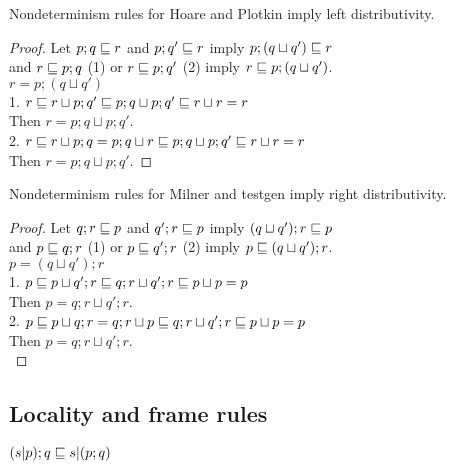 \documentclass{article}
\begin{document}
\begin{theorem}
Nondeterminism rules for Hoare and Plotkin imply left distributivity.
\end{theorem}

\verified

\begin{proof}
Let $p; q \sqsubseteq r$ and $p; q' \sqsubseteq r$ imply $p; (q \sqcup q') \sqsubseteq r$\\
and $r \sqsubseteq p; q$ (1) or $r \sqsubseteq p; q'$ (2) imply $r \sqsubseteq p; (q \sqcup q')$.\\
$r = p; (q \sqcup q')$\\
1. $r \sqsubseteq r \sqcup p; q' \sqsubseteq p; q \sqcup p; q' \sqsubseteq r \sqcup r = r$\\
Then $r = p; q \sqcup p; q'$.\\
2. $r \sqsubseteq r \sqcup p; q = p; q \sqcup r \sqsubseteq p; q \sqcup p; q' \sqsubseteq r \sqcup r = r$\\
Then $r = p; q \sqcup p; q'$.
\end{proof}

\begin{theorem}
Nondeterminism rules for Milner and testgen imply right distributivity.
\end{theorem}

\verified

\begin{proof}
Let $q; r \sqsubseteq p$ and $q'; r \sqsubseteq p$ imply $(q \sqcup q'); r \sqsubseteq p$\\
and $p \sqsubseteq q; r$ (1) or $p \sqsubseteq q'; r$ (2) imply $p \sqsubseteq (q \sqcup q'); r$.\\
$p = (q \sqcup q'); r$\\
1. $p \sqsubseteq p \sqcup q'; r \sqsubseteq q; r \sqcup q'; r \sqsubseteq p \sqcup p = p$\\
Then $p = q; r \sqcup q'; r$.\\
2. $p \sqsubseteq p \sqcup q; r = q; r \sqcup p \sqsubseteq q; r \sqcup q'; r \sqsubseteq p \sqcup p = p$\\
Then $p = q; r \sqcup q'; r$.\\
\end{proof}

\subsection*{Locality and frame rules}

\begin{law}
$(s | p); q \sqsubseteq s | (p; q)$
\end{law}
\end{document}

